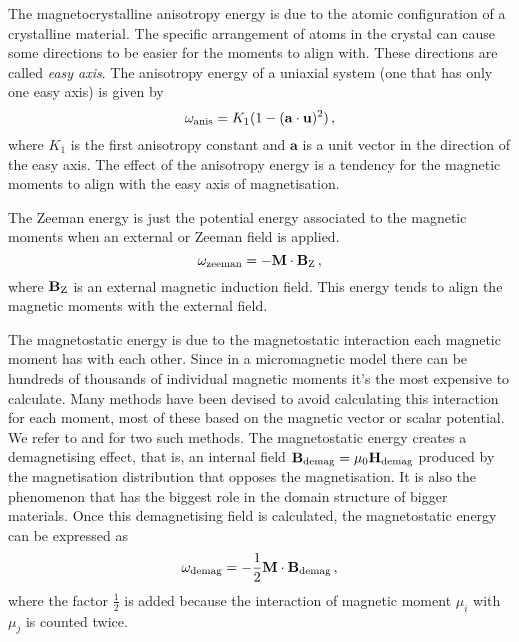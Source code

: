 The magnetocrystalline anisotropy energy is due to the atomic configuration of a crystalline material. The specific arrangement of atoms in the crystal can cause some directions to be easier for the moments to align with. These directions are called \textit{easy axis}. The anisotropy energy of a uniaxial system (one that has only one easy axis) is given by
\begin{equation}
\omega_{\textnormal{anis}} = K_1(1-(\mathbf{a}\cdot\mathbf{u})^2) \, ,
\end{equation}
where $K_1$ is the first anisotropy constant and $\mathbf{a}$ is a unit vector in the direction of the easy axis. The effect of the anisotropy energy is a tendency for the magnetic moments to align with the easy axis of magnetisation.\par

The Zeeman energy is just the potential energy associated to the magnetic moments when an external or Zeeman field is applied.
\begin{equation}
\omega_{\textnormal{zeeman}} = -\mathbf{M} \cdot \mathbf{B}_{\textnormal{Z}} \, ,
\end{equation}
where $\mathbf{B}_{\textnormal{Z}}$ is an external magnetic induction field. This energy tends to align the magnetic moments with the external field.\par

The magnetostatic energy is due to the magnetostatic interaction each magnetic moment has with each other. Since in a micromagnetic model there can be hundreds of thousands of individual magnetic moments it's the most expensive to calculate. Many methods have been devised to avoid calculating this interaction for each moment, most of these based on the magnetic vector or scalar potential. We refer to \citet{Abert} and \citet{Imhoff} for two such methods. The magnetostatic energy creates a demagnetising effect, that is, an internal field $\mathbf{B}_{\textnormal{demag}} = \mu_0 \mathbf{H}_{\textnormal{demag}}$ produced by the magnetisation distribution that opposes the magnetisation. It is also the phenomenon that has the biggest role in the domain structure of bigger materials. Once this demagnetising field is calculated, the magnetostatic energy can be expressed as
\begin{equation}
\omega_{\textnormal{demag}} = -\frac{1}{2} \mathbf{M}\cdot\mathbf{B}_{\textnormal{demag}} \, ,
\end{equation}
where the factor $\frac{1}{2}$ is added because the interaction of magnetic moment $\mu_i$ with $\mu_j$ is counted twice.\par

